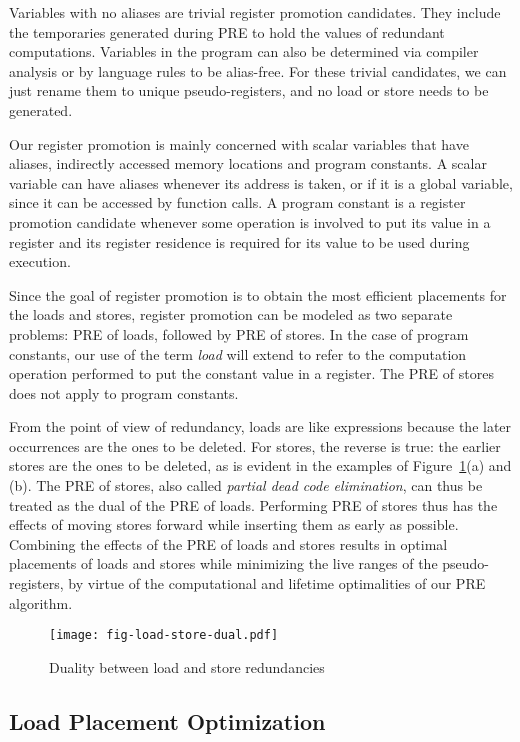 Variables with no aliases are trivial register promotion candidates.  They
include the temporaries generated during PRE to hold the values of redundant 
computations.  Variables in the program can also be determined via compiler
analysis or by language rules to be alias-free.  For these trivial candidates,
we can just rename them to unique pseudo-registers, and no load or store needs
to be generated.  

Our register promotion is
mainly concerned with scalar variables that have aliases, indirectly accessed
memory locations and program constants.  A scalar variable can have aliases
whenever its address is taken, or if it is a global variable, since it can
be accessed by function calls.  A program constant is a register promotion
candidate whenever some operation is involved to put its value in a register and
its register residence is required for its value to be used during execution.

Since the goal of
register promotion is to obtain the most efficient placements for the loads and
stores, register promotion can be modeled as two separate problems: PRE of 
loads, followed by PRE of stores.  In the case of program constants, our use of
the term \emph{load} will extend to refer to the computation operation performed
to put the constant value in a register.  The PRE of stores does not apply
to program constants.

From the point of view of redundancy, loads are like expressions because the
later occurrences are the ones to be deleted.  For stores, the reverse is true:
the earlier stores are the ones to be deleted, as is evident in the examples
of Figure~\ref{fig: load-store-dual}(a) and (b).  The PRE of stores,
also called \emph{partial dead code elimination}, can thus be treated as the
dual of the PRE of loads.  Performing PRE of stores thus has the effects
of moving stores forward while inserting them as early as possible.  
Combining the effects of the PRE of loads and stores results in optimal
placements of loads and stores while minimizing the live ranges of the
pseudo-registers, by virtue of the computational and lifetime optimalities
of our PRE algorithm.

\begin{figure}
\centering
\texttt{[image: fig-load-store-dual.pdf]}
\caption{Duality between load and store redundancies}
\label{fig: load-store-dual}
\end{figure}

\subsection{Load Placement Optimization}

